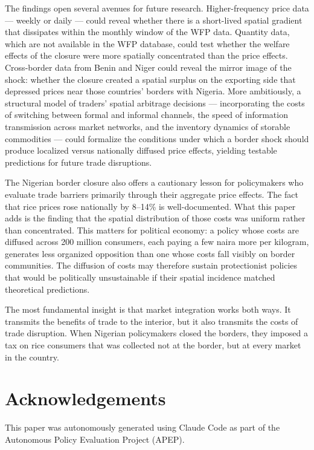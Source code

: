 \documentclass[12pt]{article}
\begin{document}
The findings open several avenues for future research. Higher-frequency price data --- weekly or daily --- could reveal whether there is a short-lived spatial gradient that dissipates within the monthly window of the WFP data. Quantity data, which are not available in the WFP database, could test whether the welfare effects of the closure were more spatially concentrated than the price effects. Cross-border data from Benin and Niger could reveal the mirror image of the shock: whether the closure created a spatial surplus on the exporting side that depressed prices near those countries' borders with Nigeria. More ambitiously, a structural model of traders' spatial arbitrage decisions --- incorporating the costs of switching between formal and informal channels, the speed of information transmission across market networks, and the inventory dynamics of storable commodities --- could formalize the conditions under which a border shock should produce localized versus nationally diffused price effects, yielding testable predictions for future trade disruptions.

The Nigerian border closure also offers a cautionary lesson for policymakers who evaluate trade barriers primarily through their aggregate price effects. The fact that rice prices rose nationally by 8--14\% is well-documented. What this paper adds is the finding that the spatial distribution of those costs was uniform rather than concentrated. This matters for political economy: a policy whose costs are diffused across 200 million consumers, each paying a few naira more per kilogram, generates less organized opposition than one whose costs fall visibly on border communities. The diffusion of costs may therefore sustain protectionist policies that would be politically unsustainable if their spatial incidence matched theoretical predictions.

The most fundamental insight is that market integration works both ways. It transmits the benefits of trade to the interior, but it also transmits the costs of trade disruption. When Nigerian policymakers closed the borders, they imposed a tax on rice consumers that was collected not at the border, but at every market in the country.


\section*{Acknowledgements}

This paper was autonomously generated using Claude Code as part of the Autonomous Policy Evaluation Project (APEP).
\end{document}
